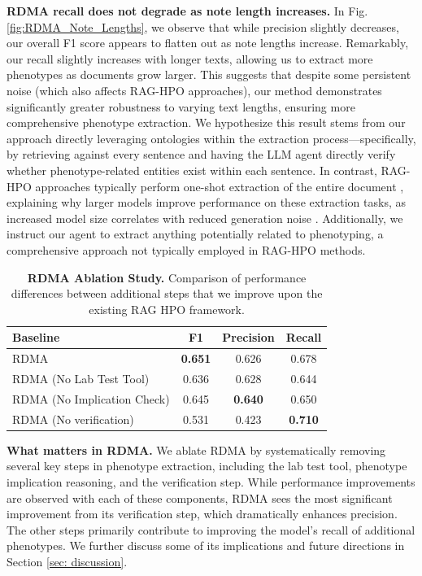\textbf{RDMA recall does not degrade as note length increases.} In Fig. \ref{fig:RDMA_Note_Lengths}, we observe that while precision slightly decreases, our overall F1 score appears to flatten out as note lengths increase. Remarkably, our recall slightly increases with longer texts, allowing us to extract more phenotypes as documents grow larger. This suggests that despite some persistent noise (which also affects RAG-HPO approaches), our method demonstrates significantly greater robustness to varying text lengths, ensuring more comprehensive phenotype extraction. We hypothesize this result stems from our approach directly leveraging ontologies within the extraction process—specifically, by retrieving against every sentence and having the LLM agent directly verify whether phenotype-related entities exist within each sentence. In contrast, RAG-HPO approaches typically perform one-shot extraction of the entire document \cite{garcia2024_HPORAG}, explaining why larger models improve performance on these extraction tasks, as increased model size correlates with reduced generation noise \cite{kaplan2020scalinglawsneurallanguage}. Additionally, we instruct our agent to extract anything potentially related to phenotyping, a comprehensive approach not typically employed in RAG-HPO methods.

\begin{table}[htbp]
    \centering
    \begin{tabular}{lccc}
        \toprule
        \textbf{Baseline} & \textbf{F1} & \textbf{Precision} & \textbf{Recall} \\
        \midrule
        RDMA & \textbf{0.651} & 0.626 & 0.678 \\
        RDMA (No Lab Test Tool) & 0.636 & 0.628 & 0.644 \\
        RDMA (No Implication Check) & 0.645 & \textbf{0.640} & 0.650 \\
        RDMA (No verification) & 0.531 & 0.423 & \textbf{0.710} \\
        \bottomrule
    \end{tabular}
    \caption{\textbf{RDMA Ablation Study.} Comparison of performance differences between additional steps that we improve upon the existing RAG HPO \cite{garcia2024_HPORAG} framework.}
    \label{tab:rdma_ablation}
\end{table}

\textbf{What matters in RDMA.} We ablate RDMA by systematically removing several key steps in phenotype extraction, including the lab test tool, phenotype implication reasoning, and the verification step. While performance improvements are observed with each of these components, RDMA sees the most significant improvement from its verification step, which dramatically enhances precision. The other steps primarily contribute to improving the model's recall of additional phenotypes. We further discuss some of its implications and future directions in Section \ref{sec: discussion}.

